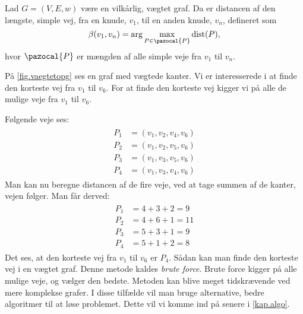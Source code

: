 \begin{defn} 
	Lad $G=(V,E,w)$ være en vilkårlig, vægtet graf. Da er distancen af den længste, simple vej, fra en knude, $v_1$, til en anden knude, $v_n$, defineret som
	\begin{equation}
		\beta(v_1,v_n)=\arg \max_{P \in \pazocal{P}}
		\textrm{dist}(P),
	\end{equation}
	hvor $\pazocal{P}$ er mængden af alle simple veje fra $v_1$ til $v_n$.
\end{defn}

\begin{exmp}
På \autoref{fig.vaegtetopg} ses en graf med vægtede kanter. Vi er interesserede i at finde den korteste vej fra $v_1$ til $v_6$. For at finde den korteste vej kigger vi på alle de mulige veje fra $v_1$ til $v_6$.

Følgende veje ses:
\begin{align}
\begin{split}
	P_1&=(v_1,v_2,v_4,v_6)\\
	P_2&=(v_1,v_2,v_5,v_6)\\
	P_3&=(v_1,v_3,v_5,v_6)\\
	P_4&=(v_1,v_3,v_4,v_6)
\end{split}
\end{align}
Man kan nu beregne distancen af de fire veje, ved at tage summen af de kanter, vejen følger. Man får derved:
\begin{align}
\begin{split}
	P_1&= 4+3+2=9\\
	P_2&= 4+6+1=11\\
	P_3&= 5+3+1=9\\
	P_4&= 5+1+2=8
\end{split}
\end{align}
Det ses, at den korteste vej fra $v_1$ til $v_6$ er $P_4$. 
Sådan kan man finde den korteste vej i en vægtet graf. Denne metode kaldes \emph{brute force}. Brute force kigger på alle mulige veje, og vælger den bedste. Metoden kan blive meget tidskrævende ved mere komplekse grafer. I disse tilfælde vil man bruge alternative, bedre algoritmer til at løse problemet. Dette vil vi komme ind på senere i \autoref{kap.algo}.
\end{exmp}


